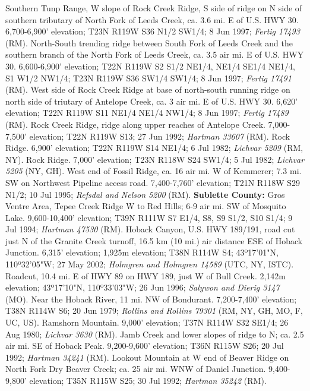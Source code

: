 Southern Tunp Range, W slope of Rock Creek Ridge, S side of ridge on N side of
southern tributary of North Fork of Leeds Creek, ca. 3.6 mi. E of U.S. HWY 30.
6,700-6,900' elevation; T23N R119W S36 N1/2 SW1/4; 8 Jun 1997;
\textit{Fertig 17493} (RM).
North-South trending ridge between South Fork of Leeds Creek and the southern
branch of the North Fork of Leeds Creek, ca. 3.5 air mi. E of U.S. HWY 30.
6,600-6,900' elevation; T22N R119W S2 S1/2 NE1/4, NE1/4 SE1/4 NE1/4,
S1 W1/2 NW1/4; T23N R119W S36 SW1/4 SW1/4; 8 Jun 1997;
\textit{Fertig 17491} (RM).
West side of Rock Creek Ridge at base of north-south running ridge on north
side of triutary of Antelope Creek, ca. 3 air mi. E of U.S. HWY 30.
6,620' elevation; T22N R119W S11 NE1/4 NE1/4 NW1/4; 8 Jun 1997;
\textit{Fertig 17489} (RM).
Rock Creek Ridge, ridge along upper reaches of Antelope Creek. 7,000-7,500'
elevation; T22N R119W S13; 27 Jun 1992; \textit{Hartman 33607} (RM).
Rock Ridge. 6,900' elevation; T22N R119W S14 NE1/4; 6 Jul 1982;
\textit{Lichvar 5209} (RM, NY).
Rock Ridge. 7,000' elevation; T23N R118W S24 SW1/4; 5 Jul 1982;
\textit{Lichvar 5205} (NY, GH).
West end of Fossil Ridge, ca. 16 air mi. W of Kemmerer; 7.3 mi. SW on Northwest
Pipeline access road. 7,400-7,760' elevation; T21N R118W S29 N1/2; 10 Jul 1995;
\textit{Refsdal and Nelson 5200} (RM).
  \textbf{Sublette County:}
Gros Ventre Area, Tepee Creek Ridge W to Red Hills; 6-9 air mi. SW of
Mosquito Lake. 9,600-10,400' elevation; T39N R111W S7 E1/4, S8, S9 S1/2,
S10 S1/4; 9 Jul 1994; \textit{Hartman 47530} (RM).
Hoback Canyon, U.S. HWY 189/191, road cut just N of the Granite Creek turnoff,
16.5 km (10 mi.) air distance ESE of Hoback Junction. 6,315' elevation;
1,925m elevation; T38N R114W S4; 43º17'01"N, 110º32'05"W; 27 May 2002;
\textit{Holmgren and Holmgren 14589} (UTC, NY, ISTC).
Roadcut, 10.4 mi. E of HWY 89 on HWY 189, just W of Bull Creek.
2,142m elevation; 43º17'10"N, 110º33'03"W; 26 Jun 1996;
\textit{Salywon and Dierig 3147} (MO).
Near the Hoback River, 11 mi. NW of Bondurant. 7,200-7,400' elevation;
T38N R114W S6; 20 Jun 1979;
\textit{Rollins and Rollins 79301} (RM, NY, GH, MO, F, UC, US).
Ramshorn Mountain. 9,000' elevation; T37N R114W S32 SE1/4; 26 Aug 1980;
\textit{Lichvar 3630} (RM).
Jamb Creek and lower slopes of ridge to N; ca. 2.5 air mi. SE of Hoback Peak.
9,200-9,600' elevation; T36N R115W S26; 20 Jul 1992;
\textit{Hartman 34241} (RM).
Lookout Mountain at W end of Beaver Ridge on North Fork Dry Beaver Creek; ca.
25 air mi. WNW of Daniel Junction. 9,400-9,800' elevation; T35N R115W S25;
30 Jul 1992; \textit{Hartman 35242} (RM).
